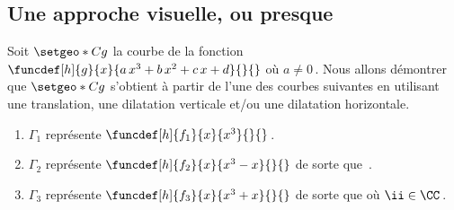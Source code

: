 \subsection{Une approche visuelle, ou presque} \label{visual-proof}

\leavevmode
\smallskip




Soit $\setgeo*{C}{g}$ la courbe de la fonction
$\funcdef[h]{g}{x}{a \, x^3 + b \, x^2 + c \, x + d}{}{}$
où $a\neq 0$\,.
Nous allons démontrer que $\setgeo*{C}{g}$ s'obtient à partir de l'une des courbes suivantes en utilisant une translation, une dilatation verticale et/ou une dilatation horizontale.
%
\begin{enumerate}
	\item $\Gamma_1$ représente $\funcdef[h]{f_1}{x}{x^3}{}{}$\,.

	\item $\Gamma_2$ représente $\funcdef[h]{f_2}{x}{x^3 - x}{}{}$ de sorte que \,.

	\item $\Gamma_3$ représente $\funcdef[h]{f_3}{x}{x^3 + x}{}{}$ de sorte que  où $\ii \in \CC$\,.
\end{enumerate}




